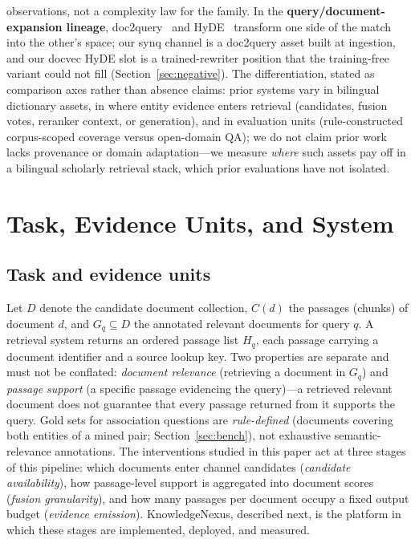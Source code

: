 \documentclass[sigconf,nonacm]{acmart}
\begin{document}
observations, not a complexity law for the family. In the
\textbf{query/document-expansion lineage}, doc2query~\cite{doc2query}
and HyDE~\cite{hyde} transform one side of the match into the other's
space; our synq channel is a doc2query asset built at ingestion, and our
docvec HyDE slot is a trained-rewriter position that the training-free
variant could not fill (Section~\ref{sec:negative}). The
differentiation, stated as comparison axes rather than absence claims:
prior systems vary in bilingual dictionary assets, in where entity
evidence enters retrieval (candidates, fusion votes, reranker context,
or generation), and in evaluation units (rule-constructed corpus-scoped
coverage versus open-domain QA); we do not claim prior work lacks
provenance or domain adaptation---we measure \emph{where} such assets
pay off in a bilingual scholarly retrieval stack, which prior
evaluations have not isolated.

\section{Task, Evidence Units, and System}
\label{sec:system}

\subsection{Task and evidence units}

Let $D$ denote the candidate document collection, $C(d)$ the passages
(chunks) of document $d$, and $G_q \subseteq D$ the annotated relevant
documents for query $q$. A retrieval system returns an ordered passage
list $H_q$, each passage carrying a document identifier and a source
lookup key. Two properties are separate and must not be conflated:
\emph{document relevance} (retrieving a document in $G_q$) and
\emph{passage support} (a specific passage evidencing the query)---a
retrieved relevant document does not guarantee that every passage
returned from it supports the query. Gold sets for association questions
are \emph{rule-defined} (documents covering both entities of a mined
pair; Section~\ref{sec:bench}), not exhaustive semantic-relevance
annotations. The interventions studied in this paper act at three
stages of this pipeline: which documents enter channel candidates
(\emph{candidate availability}), how passage-level support is
aggregated into document scores (\emph{fusion granularity}), and how
many passages per document occupy a fixed output budget (\emph{evidence
emission}). KnowledgeNexus, described next, is the platform in which
these stages are implemented, deployed, and measured.
\end{document}
